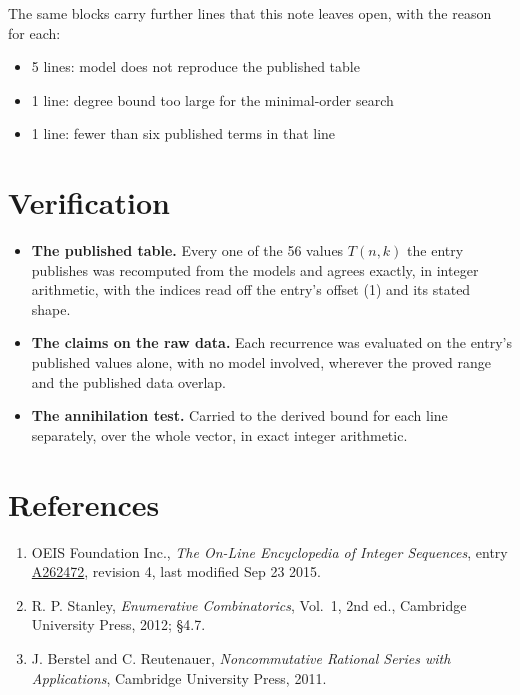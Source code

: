 \documentclass[11pt]{article}
\theoremstyle{definition}
\begin{document}
The same blocks carry further lines that this note leaves open, with the reason for each:

\begin{itemize}

\item 5 lines: model does not reproduce the published table

\item 1 line: degree bound too large for the minimal-order search

\item 1 line: fewer than six published terms in that line

\end{itemize}

\section{Verification}

\begin{itemize}

\item {\bfseries The published table.} Every one of the 56 values $T(n,k)$ the entry publishes was recomputed from the models and agrees exactly, in integer arithmetic, with the indices read off the entry's offset (1) and its stated shape.

\item {\bfseries The claims on the raw data.} Each recurrence was evaluated on the entry's published values alone, with no model involved, wherever the proved range and the published data overlap.

\item {\bfseries The annihilation test.} Carried to the derived bound for each line separately, over the whole vector, in exact integer arithmetic.

\end{itemize}

\section{References}

\begin{enumerate}

\item OEIS Foundation Inc., \emph{The On-Line Encyclopedia of Integer Sequences}, entry \href{https://oeis.org/A262472}{A262472}, revision 4, last modified Sep 23 2015.

\item R. P. Stanley, \emph{Enumerative Combinatorics}, Vol.~1, 2nd ed., Cambridge University Press, 2012; \S4.7.

\item J. Berstel and C. Reutenauer, \emph{Noncommutative Rational Series with Applications}, Cambridge University Press, 2011.

\end{enumerate}
\end{document}
